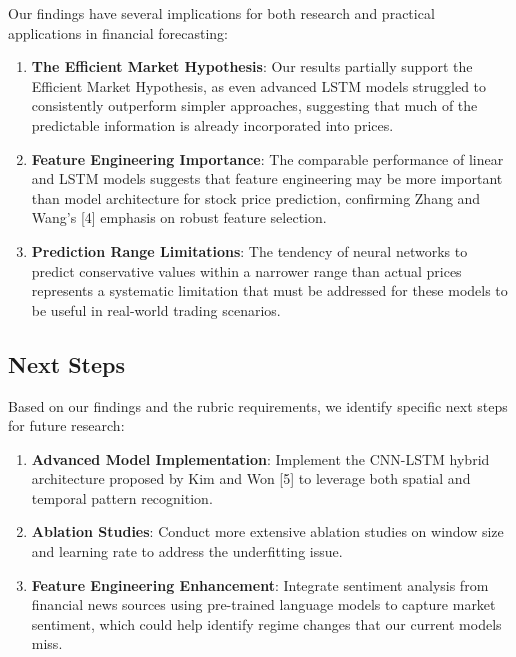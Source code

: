 \documentclass[sigconf]{acmart}
\begin{document}
Our findings have several implications for both research and practical applications in financial forecasting:

\begin{enumerate}
\item \textbf{The Efficient Market Hypothesis}: Our results partially support the Efficient Market Hypothesis, as even advanced LSTM models struggled to consistently outperform simpler approaches, suggesting that much of the predictable information is already incorporated into prices.

\item \textbf{Feature Engineering Importance}: The comparable performance of linear and LSTM models suggests that feature engineering may be more important than model architecture for stock price prediction, confirming Zhang and Wang's [4] emphasis on robust feature selection.

\item \textbf{Prediction Range Limitations}: The tendency of neural networks to predict conservative values within a narrower range than actual prices represents a systematic limitation that must be addressed for these models to be useful in real-world trading scenarios.
\end{enumerate}

\subsection{Next Steps}

Based on our findings and the rubric requirements, we identify specific next steps for future research:

\begin{enumerate}
\item \textbf{Advanced Model Implementation}: Implement the CNN-LSTM hybrid architecture proposed by Kim and Won [5] to leverage both spatial and temporal pattern recognition.

\item \textbf{Ablation Studies}: Conduct more extensive ablation studies on window size and learning rate to address the underfitting issue.

\item \textbf{Feature Engineering Enhancement}: Integrate sentiment analysis from financial news sources using pre-trained language models to capture market sentiment, which could help identify regime changes that our current models miss.
\end{enumerate}
\end{document}
